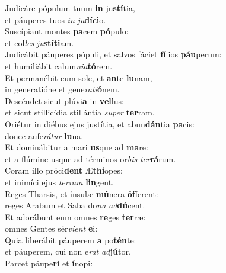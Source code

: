 \evenverse Judicáre pópulum tuum \textbf{in} ju\textbf{stí}tia,~\*\\
\evenverse et páuperes tuos \textit{in} \textit{ju}\textbf{dí}\textbf{ci}o.\\
\oddverse Suscípiant montes \textbf{pa}cem \textbf{pó}pulo:~\*\\
\oddverse et col\textit{les} \textit{ju}\textbf{stí}\textbf{ti}am.\\
\evenverse Judicábit páuperes pópuli, et salvos fáciet \textbf{fí}lios \textbf{páu}perum:~\*\\
\evenverse et humiliábit calum\textit{ni}\textit{a}\textbf{tó}rem.\\
\oddverse Et permanébit cum sole, et \textbf{an}te \textbf{lu}nam,~\*\\
\oddverse in generatióne et gene\textit{ra}\textit{ti}\textbf{ó}nem.\\
\evenverse Descéndet sicut plúvi\textbf{a} in \textbf{vel}lus:~\*\\
\evenverse et sicut stillicídia stillántia \textit{su}\textit{per} \textbf{ter}ram.\\
\oddverse Oriétur in diébus ejus justítia, et abun\textbf{dán}tia \textbf{pa}cis:~\*\\
\oddverse donec aufe\textit{rá}\textit{tur} \textbf{lu}na.\\
\evenverse Et dominábitur a mari \textbf{us}que ad \textbf{ma}re:~\*\\
\evenverse et a flúmine usque ad términos or\textit{bis} \textit{ter}\textbf{rá}rum.\\
\oddverse Coram illo próci\textbf{dent} Æ\textbf{thí}opes:~\*\\
\oddverse et inimíci ejus \textit{ter}\textit{ram} \textbf{lin}gent.\\
\evenverse Reges Tharsis, et ínsulæ \textbf{mú}nera \textbf{óf}ferent:~\*\\
\evenverse reges Arabum et Saba do\textit{na} \textit{ad}\textbf{dú}cent.\\
\oddverse Et adorábunt eum omnes \textbf{re}ges \textbf{ter}ræ:~\*\\
\oddverse omnes Gentes sér\textit{vi}\textit{ent} \textbf{e}i:\\
\evenverse Quia liberábit páuperem \textbf{a} po\textbf{tén}te:~\*\\
\evenverse et páuperem, cui non e\textit{rat} \textit{ad}\textbf{jú}tor.\\
\oddverse Parcet páupe\textbf{ri} et \textbf{í}nopi:~\*\\
